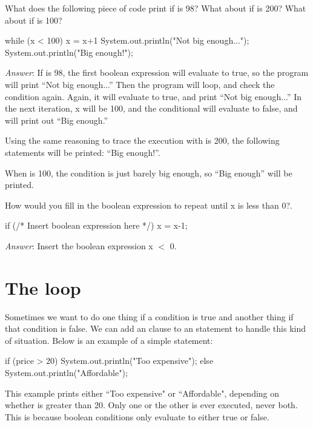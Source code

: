 \begin{example}
What does the following piece of code print if  is 98? What about if  is 200? What about if  is 100?

\begin{code}
while (x < 100) {
    x = x+1
    System.out.println("Not big enough...");
} 
System.out.println("Big enough!");
\end{code}

\emph{Answer}: If  is 98, the first boolean expression will evaluate to
true, so the program will print ``Not big enough...'' Then the program will
loop, and check the condition again.  Again, it will evaluate to true, and print
``Not big enough...'' In the next iteration, x will be 100, and the conditional
will evaluate to false, and will print out ``Big enough.''

Using the same reasoning to trace the execution with  is 200, the
following statements will be printed: ``Big enough!''.

When  is 100, the condition is just barely big enough, so ``Big enough''
will be printed.
\end{example}

\begin{example}
How would you fill in the boolean expression to repeat until x is less than 0?.

\begin{code}
if (/* Insert boolean expression here */) {
    x = x-1;
} 
\end{code}

\emph{Answer}: Insert the boolean expression x $<$ 0.
\end{example}

\section{The  loop}
Sometimes we want to do one thing if a condition is true and another thing if that condition is false. We can add an  clause to an  statement to handle this kind of situation. Below is an example of a simple  statement:

\begin{code}
if (price > 20) {
    System.out.println("Too expensive");
} else {
    System.out.println("Affordable");
}
\end{code}

\noindent This example prints either ``Too expensive" or ``Affordable", depending on whether  is greater than 20. Only one or the other is ever executed, never both. This is because boolean conditions only evaluate to either true or false.

